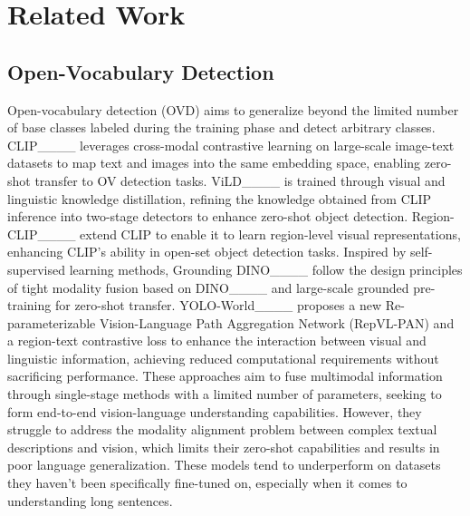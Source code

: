 \section{Related Work}
\subsection{Open-Vocabulary Detection}
Open-vocabulary detection (OVD) aims to generalize beyond the limited number of base classes labeled during the training phase and detect arbitrary classes. CLIP____ leverages cross-modal contrastive learning on large-scale image-text datasets to map text and images into the same embedding space, enabling zero-shot transfer to OV detection tasks. ViLD____ is trained through visual and linguistic knowledge distillation, refining the knowledge obtained from CLIP inference into two-stage detectors to enhance zero-shot object detection. Region-CLIP____ extend CLIP to enable it to learn region-level visual representations, enhancing CLIP's ability in open-set object detection tasks. Inspired by self-supervised learning methods, Grounding DINO____ follow the design principles of tight modality fusion based on DINO____ and large-scale grounded pre-training for zero-shot transfer. YOLO-World____ proposes a new Re-parameterizable Vision-Language Path Aggregation Network (RepVL-PAN) and a region-text contrastive loss to enhance the interaction between visual and linguistic information, achieving reduced computational requirements without sacrificing performance. These approaches aim to fuse multimodal information through single-stage methods with a limited number of parameters, seeking to form end-to-end vision-language understanding capabilities. However, they struggle to address the modality alignment problem between complex textual descriptions and vision, which limits their zero-shot capabilities and results in poor language generalization. These models tend to underperform on datasets they haven't been specifically fine-tuned on, especially when it comes to understanding long sentences.

